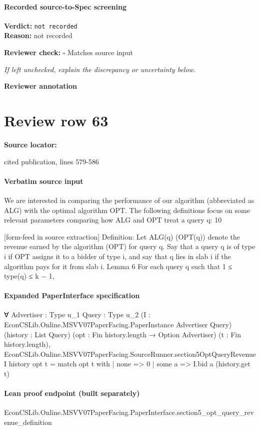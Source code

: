 \documentclass[10pt]{article}
\newcommand{\reviewerbox}{%
  \par\noindent\fbox{\parbox{0.96\linewidth}{\rule{0pt}{0.38in}}}\par
}
\newcommand{\reviewmatch}[1]{%
  \par\noindent\textbf{Reviewer check:} $\square$\; #1\par
  \noindent\emph{If left unchecked, explain the discrepancy or uncertainty below.}\par
}
\begin{document}
\paragraph{Recorded source-to-Spec screening}
\textbf{Verdict:} \texttt{not recorded}
\\
\textbf{Reason:} not recorded
\reviewmatch{Matches source input}
\noindent\textbf{Reviewer annotation}\par
\reviewerbox
\clearpage
\hypertarget{source-claim-31ab02701985c388}{}
\section*{Review row 63}
\textbf{Source locator:} {\footnotesize\raggedright cited publication, lines 579-\allowbreak{}586\par}
\paragraph{Verbatim source input}
\begin{ReviewVerbatim}
We are interested in comparing the performance of our algorithm (abbreviated as ALG) with
the optimal algorithm OPT. The following definitions focus on some relevant parameters comparing how ALG and OPT treat a query q:
10


[form-feed in source extraction]
Definition: Let ALG(q) (OPT(q)) denote the revenue earned by the algorithm (OPT) for
query q. Say that a query q is of type i if OPT assigns it to a bidder of type i, and say that q
lies in slab i if the algorithm pays for it from slab i.
Lemma 6 For each query q such that 1 ≤ type(q) ≤ k − 1,
\end{ReviewVerbatim}


\paragraph{Expanded PaperInterface specification}
\begin{ReviewVerbatim}
∀ {Advertiser : Type u_1} {Query : Type u_2} (I : EconCSLib.Online.MSVV07PaperFacing.PaperInstance Advertiser Query)
  (history : List Query) (opt : Fin history.length → Option Advertiser) (t : Fin history.length),
  EconCSLib.Online.MSVV07PaperFacing.SourceRunner.section5OptQueryRevenue I history opt t =
    match opt t with
    | none => 0
    | some a => I.bid a (history.get t)
\end{ReviewVerbatim}

\paragraph{Lean proof endpoint (built separately)}\begin{ReviewVerbatim}
EconCSLib.Online.MSVV07PaperFacing.PaperInterface.section5_opt_query_revenue_definition
\end{ReviewVerbatim}
\end{document}
